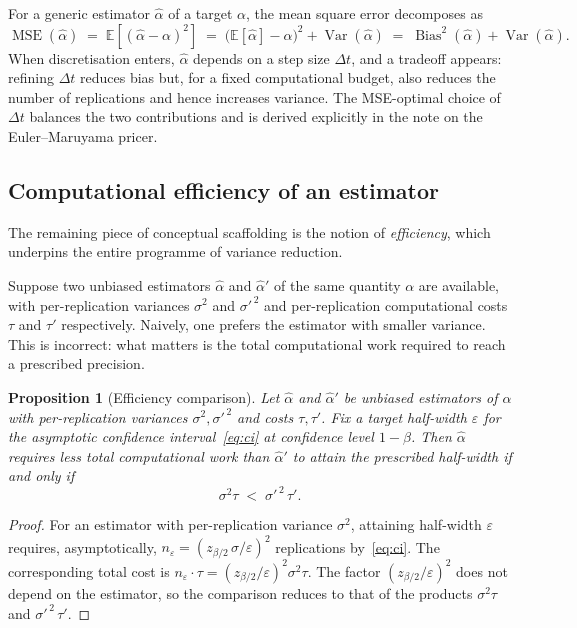 \documentclass[11pt,a4paper]{article}
\theoremstyle{plain}
\newtheorem{proposition}[theorem]{Proposition}
\theoremstyle{definition}
\theoremstyle{remark}
\newcommand{\E}{\mathbb{E}}
\newcommand{\Var}{\operatorname{Var}}
\begin{document}
For a generic estimator $\hat{\alpha}$ of a target $\alpha$, the
mean square error decomposes as
\begin{equation}
\label{eq:mse}
\operatorname{MSE}(\hat{\alpha})
\;=\; \E[(\hat{\alpha} - \alpha)^2]
\;=\; \big(\E[\hat{\alpha}] - \alpha\big)^2 + \Var(\hat{\alpha})
\;=\; \operatorname{Bias}^2(\hat{\alpha}) + \Var(\hat{\alpha}).
\end{equation}
When discretisation enters, $\hat{\alpha}$ depends on a step size
$\Delta t$, and a tradeoff appears: refining $\Delta t$ reduces bias
but, for a fixed computational budget, also reduces the number of
replications and hence increases variance. The MSE-optimal choice of
$\Delta t$ balances the two contributions and is derived
explicitly in the note on the Euler--Maruyama pricer.

\subsection{Computational efficiency of an estimator}
\label{sec:efficiency}

The remaining piece of conceptual scaffolding is the notion of
\emph{efficiency}, which underpins the entire programme of variance
reduction.

Suppose two unbiased estimators $\hat{\alpha}$ and $\hat{\alpha}'$ of
the same quantity $\alpha$ are available, with per-replication
variances $\sigma^2$ and $\sigma'^{\,2}$ and per-replication
computational costs $\tau$ and $\tau'$ respectively. Naively, one
prefers the estimator with smaller variance. This is incorrect: what
matters is the total computational work required to reach a prescribed
precision.

\begin{proposition}[Efficiency comparison]
\label{prop:efficiency}
Let $\hat{\alpha}$ and $\hat{\alpha}'$ be unbiased estimators of
$\alpha$ with per-replication variances $\sigma^2, \sigma'^{\,2}$ and
costs $\tau, \tau'$. Fix a target half-width $\varepsilon$ for the
asymptotic confidence interval~\eqref{eq:ci} at confidence level
$1-\beta$. Then $\hat{\alpha}$ requires less total computational work
than $\hat{\alpha}'$ to attain the prescribed half-width if and only if
\begin{equation}
\label{eq:eff-criterion}
\sigma^2 \tau \;<\; \sigma'^{\,2}\, \tau'.
\end{equation}
\end{proposition}

\begin{proof}
For an estimator with per-replication variance $\sigma^2$, attaining
half-width $\varepsilon$ requires, asymptotically, $n_\varepsilon =
(z_{\beta/2}\,\sigma / \varepsilon)^2$ replications by~\eqref{eq:ci}.
The corresponding total cost is
$n_\varepsilon \cdot \tau = (z_{\beta/2} / \varepsilon)^2 \sigma^2 \tau$.
The factor $(z_{\beta/2}/\varepsilon)^2$ does not depend on the
estimator, so the comparison reduces to that of the products
$\sigma^2 \tau$ and $\sigma'^{\,2}\,\tau'$.
\end{proof}
\end{document}
